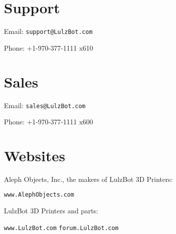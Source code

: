 \section{Support}
\setlength{\parindent}{0pt}
Email: \texttt{support@LulzBot.com}

Phone: +1-970-377-1111 x610

\section{Sales}

Email: \texttt{sales@LulzBot.com}

Phone: +1-970-377-1111 x600

\section{Websites}

Aleph Objects, Inc., the makers of LulzBot 3D Printers:

\texttt{www.AlephObjects.com}

LulzBot 3D Printers and parts:

\texttt{www.LulzBot.com}
\texttt{forum.LulzBot.com}
